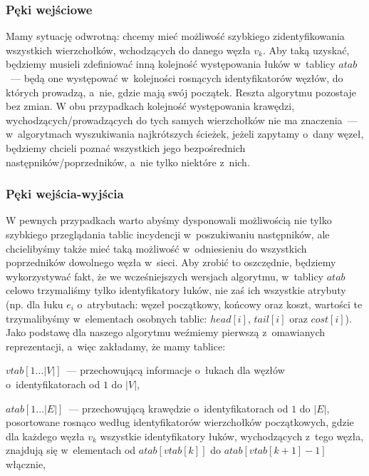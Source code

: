 \subsubsection{Pęki wejściowe}

Mamy sytuację odwrotną: chcemy mieć możliwość szybkiego zidentyfikowania wszystkich wierzchołków, wchodzących do danego węzła $v_{k}$. Aby taką uzyskać, będziemy musieli zdefiniować inną kolejność występowania łuków w~tablicy $atab$~---  będą one występować w~kolejności rosnących identyfikatorów węzłów, do których prowadzą, a~nie, gdzie mają swój początek. Reszta algorytmu pozostaje bez zmian. W obu przypadkach kolejność występowania krawędzi, wychodzących/prowadzących do tych samych wierzchołków nie ma znaczenia~---  w~algorytmach wyszukiwania najkrótszych ścieżek, jeżeli zapytamy o~dany węzeł, będziemy chcieli poznać wszystkich jego bezpośrednich następników/poprzedników, a~nie tylko niektóre z~nich.

\subsubsection{Pęki wejścia-wyjścia}

W pewnych przypadkach warto abyśmy dysponowali możliwością nie tylko szybkiego przeglądania tablic incydencji w~poszukiwaniu następników, ale chcielibyśmy także mieć taką możliwość w~odniesieniu do wszystkich poprzedników dowolnego węzła w~sieci. Aby zrobić to oszczędnie, będziemy wykorzystywać fakt, że we wcześniejszych wersjach algorytmu, w~tablicy $atab$ celowo trzymaliśmy tylko identyfikatory łuków, nie zaś ich wszystkie atrybuty (np. dla łuku $e_{i}$ o~atrybutach: węzeł początkowy, końcowy oraz koszt, wartości te trzymalibyśmy w~elementach osobnych tablic: $head \left[ i \right] $,  $tail \left[ i \right] $ oraz  $cost \left[ i \right] $). Jako podstawę dla naszego algorytmu weźmiemy pierwszą z~omawianych reprezentacji, a~więc zakładamy, że mamy tablice:

\begin{myitemize}
	\item $ vtab \left[ 1 \ldots \left| V \right| \right] $~---  przechowującą informacje o~łukach dla węzłów o~identyfikatorach od $1$ do $ \left| V \right| $,
	\item $atab \left[ 1 \ldots \left| E \right| \right] $~---  przechowującą krawędzie o~identyfikatorach od $1$ do $ \left| E \right| $, posortowane rosnąco według identyfikatorów wierzchołków początkowych, gdzie dla każdego węzła $v_{k}$ wszystkie identyfikatory łuków, wychodzących z~tego węzła, znajdują się w~elementach od $atab \left[ vtab \left[ k \right] \right] $ do $atab \left[ vtab \left[ k+1 \right] -1 \right] $ włącznie,
\end{myitemize}

